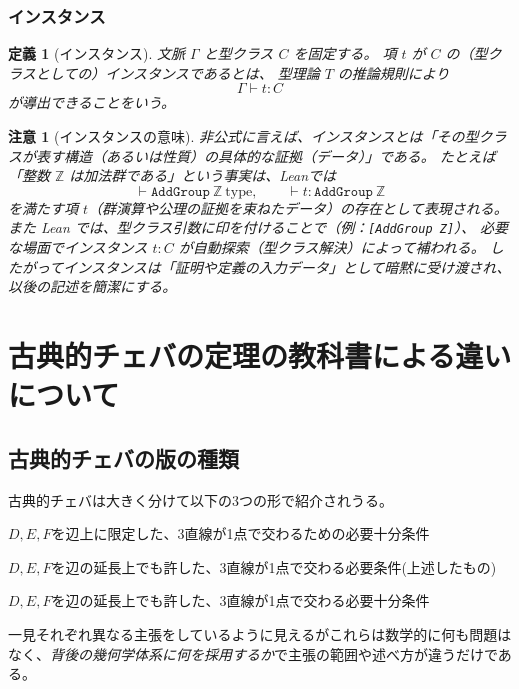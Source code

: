 \documentclass[a4paper,12pt]{bxjsbook}
\newlength{\customindent}
\newenvironment{body}{
  \par
  \begingroup
  \setlength{\leftskip}{\customindent}
  \setlength{\rightskip}{0pt}
  \setlength{\parindent}{1em}
  \setlength{\displayindent}{\customindent}
  \setlength{\displaywidth}{\dimexpr\linewidth-\customindent\relax}
}{
  \par
  \endgroup
}
\theoremstyle{theorem}
\newtheorem{definition}[theorem]{定義}
\newtheorem{remark}[theorem]{注意}
\begin{document}
    \subsection{インスタンス}
    \begin{definition}[インスタンス]
        文脈 $\Gamma$ と型クラス $C$ を固定する。
        項 $t$ が $C$ の（型クラスとしての）\emph{インスタンス}であるとは、
        型理論 $T$ の推論規則により
        \[
        \Gamma \vdash t : C
        \]
        が導出できることをいう。
    \end{definition}

    \begin{remark}[インスタンスの意味]
        非公式に言えば、インスタンスとは「その型クラスが表す構造（あるいは性質）の具体的な証拠（データ）」である。
        たとえば「整数 $\mathbb{Z}$ は加法群である」という事実は、Leanでは
        \[
        \vdash \texttt{AddGroup}\ \mathbb{Z}\ \text{type},\qquad \vdash t : \texttt{AddGroup}\ \mathbb{Z}
        \]
        を満たす項 $t$（群演算や公理の証拠を束ねたデータ）の存在として表現される。
        また Lean では、型クラス引数に印を付けることで（例：\texttt{[AddGroup Z]}）、 必要な場面でインスタンス $t:C$ が自動探索（型クラス解決）によって補われる。
        したがってインスタンスは「証明や定義の入力データ」として暗黙に受け渡され、以後の記述を簡潔にする。
    \end{remark}

    \chapter{古典的チェバの定理の教科書による違いについて}

    \section{古典的チェバの版の種類}
    \begin{body}
        \indent 古典的チェバは大きく分けて以下の3つの形で紹介されうる。
        \begin{bodyitemize}
            \item[①] $D, E, F$を辺上に限定した、3直線が1点で交わるための必要十分条件
            \item[②] $D, E, F$を辺の延長上でも許した、3直線が1点で交わる必要条件(上述したもの)
            \item[③] $D, E, F$を辺の延長上でも許した、3直線が1点で交わる必要十分条件
        \end{bodyitemize}

        \indent 一見それぞれ異なる主張をしているように見えるがこれらは数学的に何も問題はなく、\emph{背後の幾何学体系に何を採用するか}で主張の範囲や述べ方が違うだけである。

    \end{body}
\end{document}
